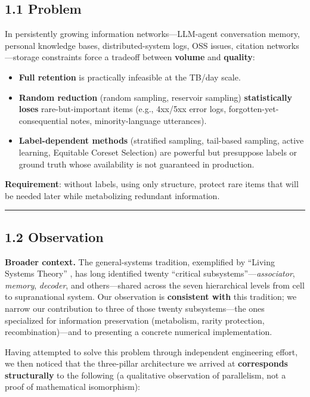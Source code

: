 \subsection{1.1 Problem}\label{problem}

In persistently growing information networks---LLM-agent conversation memory, personal knowledge bases, distributed-system logs, OSS issues, citation networks---storage constraints force a tradeoff between \textbf{volume} and \textbf{quality}:

\begin{itemize}
\tightlist
\item
  \textbf{Full retention} is practically infeasible at the TB/day scale.
\item
  \textbf{Random reduction} (random sampling, reservoir sampling) \textbf{statistically loses} rare-but-important items (e.g., 4xx/5xx error logs, forgotten-yet-consequential notes, minority-language utterances).
\item
  \textbf{Label-dependent methods} (stratified sampling, tail-based sampling, active learning, Equitable Coreset Selection) are powerful but presuppose labels or ground truth whose availability is not guaranteed in production.
\end{itemize}

\textbf{Requirement}: without labels, using only structure, protect rare items that will be needed later while metabolizing redundant information.

\begin{center}\rule{0.5\linewidth}{0.5pt}\end{center}

\subsection{1.2 Observation}\label{observation}

\textbf{Broader context.} The general-systems tradition, exemplified by ``Living Systems Theory'' \citep{miller1978livingsystems}, has long identified twenty ``critical subsystems''---\emph{associator}, \emph{memory}, \emph{decoder}, and others---shared across the seven hierarchical levels from cell to supranational system. Our observation is \textbf{consistent with} this tradition; we narrow our contribution to three of those twenty subsystems---the ones specialized for information preservation (metabolism, rarity protection, recombination)---and to presenting a concrete numerical implementation.

Having attempted to solve this problem through independent engineering effort, we then noticed that the three-pillar architecture we arrived at \textbf{corresponds structurally} to the following (a qualitative observation of parallelism, not a proof of mathematical isomorphism):

